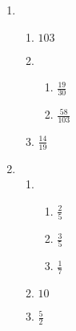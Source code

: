 {\begin{multicols}{3}
\begin{enumerate}[noitemsep, label=\textbf{\arabic*}. ]
      \item %
	    \begin{enumerate}[noitemsep, label=\textbf{(\alph*)} ]
		\item $103$ %
		\item %
		    \begin{enumerate}[itemsep=1pt,  label=\textbf{\roman*}. ] 
			\item $\frac{19}{30}$%
			\item $\frac{58}{103}$%
		    \end{enumerate} 
		\item $\frac{14}{19}$%
	    \end{enumerate}

      \item %
	    \begin{enumerate}[noitemsep, label=\textbf{(\alph*)} ]
		  \item %
		      \begin{enumerate}[itemsep=1pt,  label=\textbf{\roman*}. ] 
			    \item $\frac{2}{5}$%
			    \item $\frac{3}{5}$%
			    \item $\frac{1}{7}$%
		      \end{enumerate}
		  \item $10$%
		  \item$\frac{5}{2}$ %
	    \end{enumerate}


\end{enumerate}
\end{multicols}}
